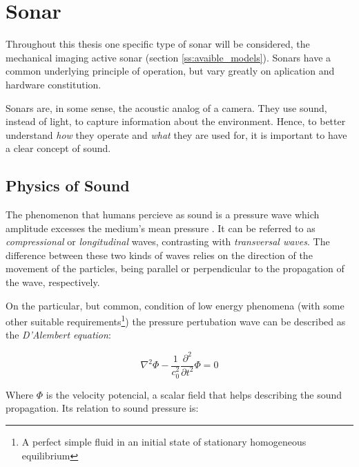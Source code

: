 \section{Sonar}


Throughout this thesis one specific type of sonar will be considered, the
mechanical imaging active sonar (section \ref{ss:avaible_models}). Sonars have a common
underlying principle of operation, but vary greatly on aplication and hardware
constitution.


Sonars are, in some sense, the acoustic analog of a camera. They use sound,
instead of light, to capture information about the environment. Hence, to better
understand \textit{how} they operate and \textit{what} they are used for, it is
important to have a clear concept of sound.

\subsection{Physics of Sound}

The phenomenon that humans percieve as sound is a pressure wave which
amplitude excesses the medium's mean pressure \cite{FEYNMAN}. It can be
referred to as \textit{compressional} or \textit{longitudinal} waves, contrasting with
\textit{transversal waves}. The difference between these two kinds of waves
relies on the direction of the movement of the particles, being parallel or
perpendicular to the propagation of the wave, respectively\cite{BRUNEAU}.

On the particular, but common, condition of low energy
phenomena\cite{Lefebvre} (with some other suitable requirements\footnote{A
perfect simple fluid in an initial state of stationary homogeneous equilibrium})
the pressure pertubation wave can be described as the \textit{D'Alembert
equation}:
 
\begin{equation}\label{eq:lambert}
\nabla^2 \Phi - \frac{1}{c^2_0}\frac{\partial^2}{\partial t^2} \Phi = 0
\end{equation}

Where $\Phi$ is the velocity potencial, a scalar field that helps describing the
sound propagation. Its relation to sound pressure is:

